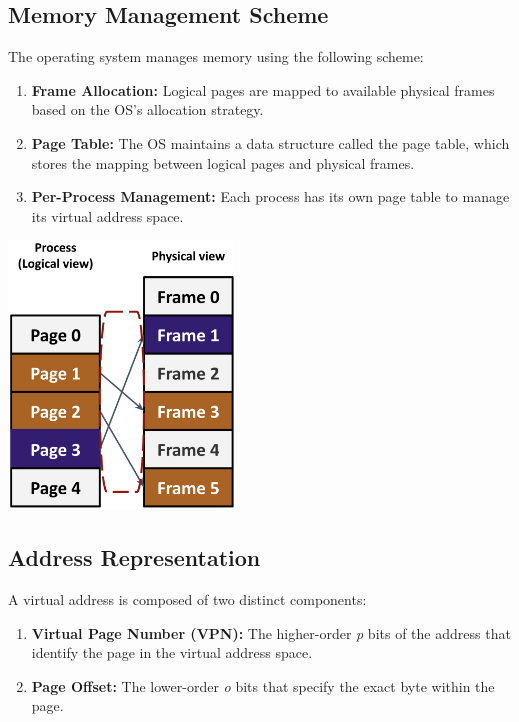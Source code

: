 \documentclass[../../compsys.tex]{subfiles}
\begin{document}
\subsection{Memory Management Scheme}
The operating system manages memory using the following scheme:\\[5px]
\noindent
\begin{minipage}{0.45\textwidth}
\begin{enumerate}
  \item \textbf{Frame Allocation:} Logical pages are mapped to available physical frames based on the OS's allocation strategy.
  \item \textbf{Page Table:} The OS maintains a data structure called the page table, which stores the mapping between logical pages and physical frames.
  \item \textbf{Per-Process Management:} Each process has its own page table to manage its virtual address space.
\end{enumerate}
\end{minipage}%
\hfill
\vline
\hfill
\begin{minipage}{0.45\textwidth}
  \begin{center}
    \includegraphics[width=0.45\textwidth]{chapters/L5/images/mapping.png}
  \end{center}
\end{minipage}

\subsection{Address Representation}
A virtual address is composed of two distinct components:
\begin{enumerate}
  \item \textbf{Virtual Page Number (VPN):} The higher-order \textit{p} bits of the address that identify the page in the virtual address space.
  \item \textbf{Page Offset:} The lower-order \textit{o} bits that specify the exact byte within the page.
\end{enumerate}
\end{document}
